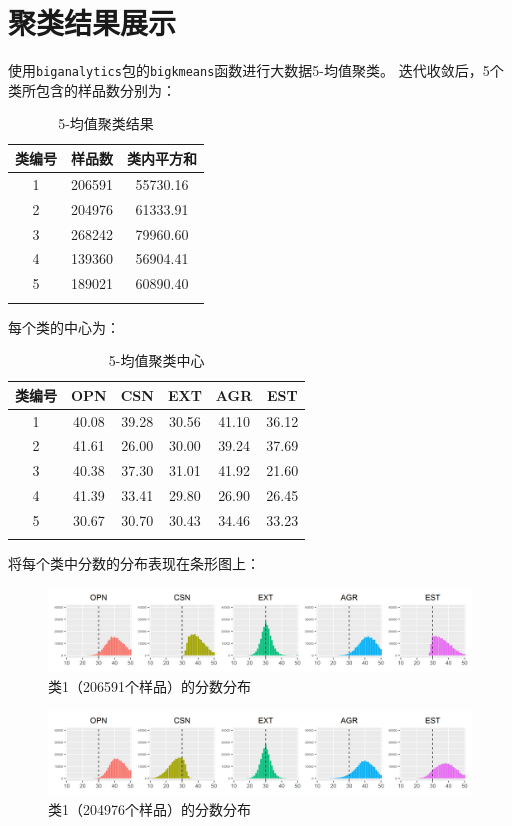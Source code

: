 \documentclass[UTF8]{ctexart}
\begin{document}
\section{聚类结果展示}
使用\texttt{biganalytics}包的\texttt{bigkmeans}函数进行大数据5-均值聚类。
迭代收敛后，5个类所包含的样品数分别为：
\begin{longtable}{c|c|c}
  \hline
  类编号 & 样品数    & 类内平方和    \\\hline
  1   & 206591 & 55730.16 \\\hline
  2   & 204976 & 61333.91 \\\hline
  3   & 268242 & 79960.60 \\\hline
  4   & 139360 & 56904.41 \\\hline
  5   & 189021 & 60890.40 \\\hline
  \caption{5-均值聚类结果}
\end{longtable}
\noindent 每个类的中心为：
\begin{longtable}{c|c|c|c|c|c}
  \hline
  类编号 & OPN   & CSN   & EXT   & AGR   & EST   \\\hline
  1   & 40.08 & 39.28 & 30.56 & 41.10 & 36.12 \\\hline
  2   & 41.61 & 26.00 & 30.00 & 39.24 & 37.69 \\\hline
  3   & 40.38 & 37.30 & 31.01 & 41.92 & 21.60 \\\hline
  4   & 41.39 & 33.41 & 29.80 & 26.90 & 26.45 \\\hline
  5   & 30.67 & 30.70 & 30.43 & 34.46 & 33.23 \\\hline
  \caption{5-均值聚类中心}
  \label{center}
\end{longtable}
\noindent 将每个类中分数的分布表现在条形图上：
\begin{figure}[H]
  \centering
  \includegraphics[scale=0.478]{Cluster1.png}
  \caption{类1（206591个样品）的分数分布}
\end{figure}
\begin{figure}[H]
  \centering
  \includegraphics[scale=0.478]{Cluster2.png}
  \caption{类1（204976个样品）的分数分布}
\end{figure}
\end{document}
